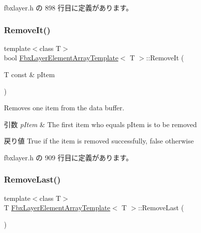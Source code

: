  fbxlayer.\+h の 898 行目に定義があります。

\mbox{\label{class_fbx_layer_element_array_template_abecc76d8203687b7963f2c4fa2d43a1e}} 
\subsubsection{\texorpdfstring{Remove\+It()}{RemoveIt()}}
{\footnotesize\ttfamily template$<$class T$>$ \\
bool \hyperlink{class_fbx_layer_element_array_template}{Fbx\+Layer\+Element\+Array\+Template}$<$ T $>$\+::Remove\+It (\begin{DoxyParamCaption}\item[{T const \&}]{p\+Item }\end{DoxyParamCaption})\hspace{0.3cm}{\ttfamily [inline]}}

Removes one item from the data buffer. 
\begin{DoxyParams}{引数}
{\em p\+Item} & The first item who equals p\+Item is to be removed \\
\hline
\end{DoxyParams}
\begin{DoxyReturn}{戻り値}
{\ttfamily True} if the item is removed successfully, {\ttfamily false} otherwise 
\end{DoxyReturn}


 fbxlayer.\+h の 909 行目に定義があります。

\mbox{\label{class_fbx_layer_element_array_template_ac5f508f41799c5f3f2e0c045ab874063}} 
\subsubsection{\texorpdfstring{Remove\+Last()}{RemoveLast()}}
{\footnotesize\ttfamily template$<$class T$>$ \\
T \hyperlink{class_fbx_layer_element_array_template}{Fbx\+Layer\+Element\+Array\+Template}$<$ T $>$\+::Remove\+Last (\begin{DoxyParamCaption}{ }\end{DoxyParamCaption})\hspace{0.3cm}{\ttfamily [inline]}}

